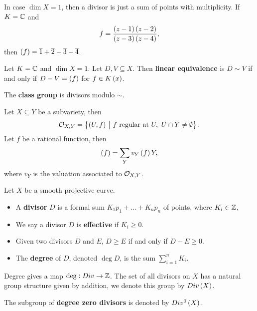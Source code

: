 \begin{example}
In case $ \dim X = 1 $, then a divisor is just a sum of points with multiplicity. If $ K = \mathbb{C} $ and
$$ f = \dfrac{\br{z - 1}\br{z - 2}}{\br{z - 3}\br{z - 4}}, $$
then $ \br{f} = \overline{1} + \overline{2} - \overline{3} - \overline{4} $.
\end{example}

\begin{definition}
Let $ K = \mathbb{C} $ and $ \dim X = 1 $. Let $ D, V \subseteq X $. Then \textbf{linear equivalence} is $ D \sim V $ if and only if $ D - V = \br{f} $ for $ f \in K\br{x} $.
\end{definition}

\begin{definition}
The \textbf{class group} is divisors modulo $ \sim $.
\end{definition}

\begin{definition}
Let $ X \subseteq Y $ be a subvariety, then
$$ \OOO_{X, Y} = \cbr{\br{U, f} \st f \ \text{regular at} \ U, \ U \cap Y \ne \emptyset}. $$
Let $ f $ be a rational function, then
$$ \br{f} = \sum_Y v_Y\br{f}Y, $$
where $ v_Y $ is the valuation associated to $ \mathcal{O}_{X, Y} $.
\end{definition}


\begin{definition}
Let $ X $ be a smooth projective curve.
\begin{itemize}
\item A \textbf{divisor} $ D $ is a formal sum $ K_1p_1 + \dots + K_np_n $ of points, where $ K_i \in \mathbb{Z} $,
\item We say a divisor $ D $ is \textbf{effective} if $ K_i \ge 0 $.
\item Given two divisors $ D $ and $ E $, $ D \ge E $ if and only if $ D - E \ge 0 $.
\item The \textbf{degree} of $ D $, denoted $ \deg D $, is the sum $ \sum_{i = 1}^n K_i $.
\end{itemize}
\end{definition}

\begin{remark}
Degree gives a map $ \deg : Div \to \mathbb{Z} $. The set of all divisors on $ X $ has a natural group structure given by addition, we denote this group by $ Div\br{X} $.
\end{remark}

\begin{notation}
The subgroup of \textbf{degree zero divisors} is denoted by $ Div^0\br{X} $.
\end{notation}


